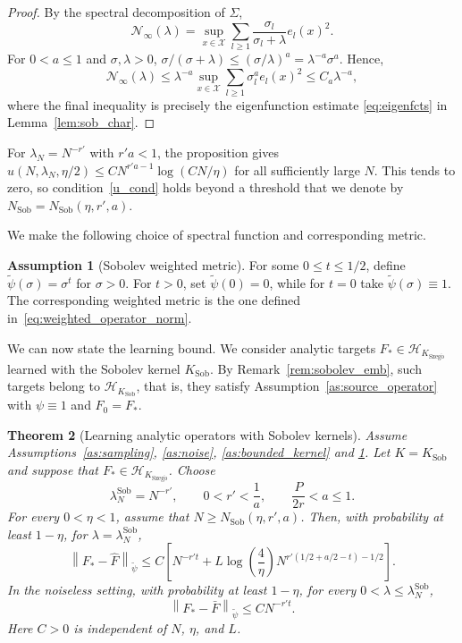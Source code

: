 \documentclass[11pt]{article}
\numberwithin{equation}{section}
\theoremstyle{plain}
\newtheorem{theorem}{Theorem}[section]
\theoremstyle{definition}
\newtheorem{assumption}[theorem]{Assumption}
\theoremstyle{remark}
\newcommand{\X}{\mathcal{X}}
\newcommand{\Hs}{\mathcal{H}}
\newcommand{\norm}[1]{\left\lVert#1\right\rVert}
\newcommand{\tpsi}{\widetilde{\psi}}
\begin{document}
\begin{proof}
By the spectral decomposition of $\Sigma$,
\[
\mathcal{N}_{\infty}(\lambda)
=
\sup_{x\in\X}
\sum_{l\geq1}
\frac{\sigma_l}{\sigma_l+\lambda}e_l(x)^2.
\]
For $0<a\leq1$ and $\sigma,\lambda>0$,
$\sigma/(\sigma+\lambda)\leq(\sigma/\lambda)^a=\lambda^{-a}\sigma^a$.
Hence,
\[
\mathcal{N}_{\infty}(\lambda)
\leq
\lambda^{-a}
\sup_{x\in\X}
\sum_{l\geq1}\sigma_l^a e_l(x)^2
\leq
C_a\lambda^{-a},
\]
where the final inequality is precisely the eigenfunction estimate
\eqref{eq:eigenfcts} in Lemma~\ref{lem:sob_char}.
\end{proof}

For $\lambda_N=N^{-r'}$ with $r'a<1$, the proposition gives
$u(N,\lambda_N,\eta/2)\leq C N^{r'a-1}\log(CN/\eta)$ for all sufficiently
large $N$. This tends to zero, so condition~\eqref{u_cond} holds beyond a
threshold that we denote by
$N_{\mathrm{Sob}}=N_{\mathrm{Sob}}(\eta,r',a)$.

We make the following choice of
spectral function and corresponding metric.

\begin{assumption}[Sobolev weighted metric]
\label{as:sob_norm}
For some $0\leq t\leq1/2$, define
$\tpsi(\sigma)=\sigma^t$ for $\sigma>0$.
For $t>0$, set $\tpsi(0)=0$, while for $t=0$ take
$\tpsi(\sigma)\equiv1$. The corresponding weighted metric is the one defined
in~\eqref{eq:weighted_operator_norm}.
\end{assumption}

We can now state the learning bound. We consider analytic targets
$F_*\in\Hs_{K_{\mathrm{Szeg\ddot{o}}}}$ learned with the Sobolev kernel
$K_{\mathrm{Sob}}$. By Remark~\ref{rem:sobolev_emb}, such targets belong
to $\Hs_{K_{\mathrm{Sob}}}$, that is, they satisfy
Assumption~\ref{as:source_operator} with $\psi\equiv1$ and $F_0=F_*$.

\begin{theorem}[Learning analytic operators with Sobolev kernels]
\label{thm:main_sob_operator}
Assume Assumptions~\ref{as:sampling}, \ref{as:noise},
\ref{as:bounded_kernel} and \ref{as:sob_norm}. Let $K=K_{\mathrm{Sob}}$ and suppose that
$F_*\in\Hs_{K_{\mathrm{Szeg\ddot{o}}}}$. Choose
\[
\lambda_N^{\mathrm{Sob}}=N^{-r'},
\qquad
0<r'<\frac{1}{a},
\qquad
\frac{P}{2r}<a\leq1.
\]
For every $0<\eta<1$, assume that
$N\geq N_{\mathrm{Sob}}(\eta,r',a)$. Then, with probability at least
$1-\eta$,
for $\lambda=\lambda_N^{\mathrm{Sob}}$,
\begin{equation}
\norm{F_*-\hat{F}}_{\tpsi}
\leq
C\left[
N^{-r't}
+
L\log\left(\frac{4}{\eta}\right)
N^{r'(1/2+a/2-t)-1/2}
\right].
\label{eq:main_sob_operator}
\end{equation}
In the noiseless setting, with probability at least $1-\eta$, for every
$0<\lambda\leq\lambda_N^{\mathrm{Sob}}$,
\begin{equation}
\norm{F_*-\bar{F}}_{\tpsi}
\leq
C N^{-r't}.
\label{eq:main_sob_operator_noiseless}
\end{equation}
Here $C>0$ is independent of $N$, $\eta$, and $L$.
\end{theorem}
\end{document}
